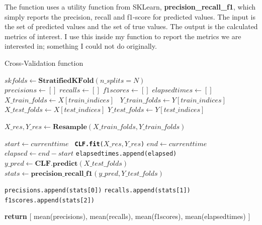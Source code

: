 \documentclass[12pt,a4paper,twoside]{report}
\begin{document}
The function uses a utility function from SKLearn, \textbf{precision\_recall\_f1}, which simply reports the precision, recall and f1-score for predicted values. The input is the set of predicted values and the set of true values. The output is the calculated metrics of interest. I use this inside my function to report the metrics we are interested in; something I could not do originally. 

\begin{algorithm}[!htbp]
\caption{Cross-Validation function }\label{alg:cross-val}
\begin{algorithmic}[1]

   \State $skfolds\gets \textbf{StratifiedKFold}(n\_splits = N)$\\
   
   \State $precisions\gets []$
   \State $recalls\gets []$
   \State $f1scores\gets []$
   \State $elapsedtimes\gets []$\\
   
        \State
         \texttt{\State $X\_train\_folds\gets X[train\_indices]$}
        \texttt{ \State $Y\_train\_folds\gets Y[train\_indices]$}
        \texttt{ \State $X\_test\_folds\gets X[test\_indices]$}
         \texttt{\State $Y\_test\_folds\gets Y[test\_indices]$}
         
         \texttt{\State $X\_res, Y\_res \gets \textbf{Resample}(X\_train\_folds,Y\_train\_folds)$}
         
          \texttt{\State $ start \gets current time$} 
          \texttt{ \State \textbf{CLF.fit}($X\_res, Y\_res$)} 
          \texttt{\State $ end \gets current time$} 
          \texttt{\State $ elapsed \gets end - start$} 
          \texttt{\State elapsedtimes.append(elapsed)} 
           \texttt{\State $y\_pred \gets \textbf{CLF.predict}(X\_test\_folds)$} 
          \texttt{\State $stats \gets \textbf{precision\_recall\_f1}(y\_pred, Y\_test\_folds )$} 
          
          \texttt{\State precisions.append(stats[0])}
          \texttt{\State recalls.append(stats[1])}  
          \texttt{\State f1scores.append(stats[2])} 
   \EndFor
   
   \State \textbf{return} [ mean(precisions), mean(recalls), mean(f1scores), mean(elapsedtimes) ]
   
\EndProcedure
\end{algorithmic}
\end{algorithm}
\end{document}
